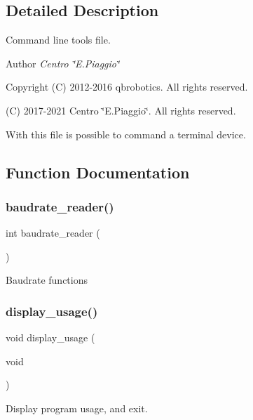\subsection{Detailed Description}
Command line tools file. 

\begin{DoxyAuthor}{Author}
{\itshape Centro \char`\"{}\+E.\+Piaggio\char`\"{}} 
\end{DoxyAuthor}
\begin{DoxyCopyright}{Copyright}
(C) 2012-\/2016 qbrobotics. All rights reserved. 

(C) 2017-\/2021 Centro \char`\"{}\+E.\+Piaggio\char`\"{}. All rights reserved.
\end{DoxyCopyright}
With this file is possible to command a terminal device. 

\subsection{Function Documentation}
\mbox{\label{qbadmin_8c_a872d84bb02f7d8f4617246f0c6d37c43}} 
\subsubsection{baudrate\+\_\+reader()}
{\footnotesize\ttfamily int baudrate\+\_\+reader (\begin{DoxyParamCaption}{ }\end{DoxyParamCaption})}

Baudrate functions \mbox{\label{qbadmin_8c_acf5088e61b616f77674f62a9ba3b86b7}} 
\subsubsection{display\+\_\+usage()}
{\footnotesize\ttfamily void display\+\_\+usage (\begin{DoxyParamCaption}\item[{void}]{ }\end{DoxyParamCaption})}

Display program usage, and exit. \mbox{\label{qbadmin_8c_a98a5d602fbf649e7f9e8f851cb757f71}} 
